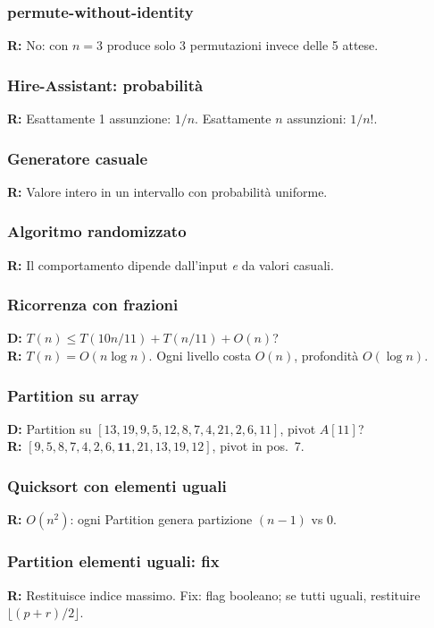 \documentclass[a4paper, 11pt]{article}
\theoremstyle{definition}
\theoremstyle{remark}
\theoremstyle{remark}
\begin{document}
	\subsubsection*{permute-without-identity}
	\textbf{R:} No: con $n=3$ produce solo 3 permutazioni invece delle 5 attese.
	
	\subsubsection*{Hire-Assistant: probabilità}
	\textbf{R:} Esattamente 1 assunzione: $1/n$. Esattamente $n$ assunzioni:
	$1/n!$.
	
	\subsubsection*{Generatore casuale}
	\textbf{R:} Valore intero in un intervallo con probabilità uniforme.
	
	\subsubsection*{Algoritmo randomizzato}
	\textbf{R:} Il comportamento dipende dall'input \emph{e} da valori casuali.
	
	\subsubsection*{Ricorrenza con frazioni}
	\textbf{D:} $T(n)\le T(10n/11)+T(n/11)+O(n)$?\\
	\textbf{R:} $T(n) = O(n\log n)$. Ogni livello costa $O(n)$, profondità
	$O(\log n)$.
	
	\subsubsection*{Partition su array}
	\textbf{D:} Partition su $[13,19,9,5,12,8,7,4,21,2,6,11]$, pivot $A[11]$?\\
	\textbf{R:} $[9,5,8,7,4,2,6,\mathbf{11},21,13,19,12]$, pivot in pos.\ 7.
	
	\subsubsection*{Quicksort con elementi uguali}
	\textbf{R:} $O(n^2)$: ogni Partition genera partizione $(n{-}1)$ vs $0$.
	
	\subsubsection*{Partition elementi uguali: fix}
	\textbf{R:} Restituisce indice massimo. Fix: flag booleano; se tutti uguali,
	restituire $\lfloor(p+r)/2\rfloor$.
	
\end{document}
